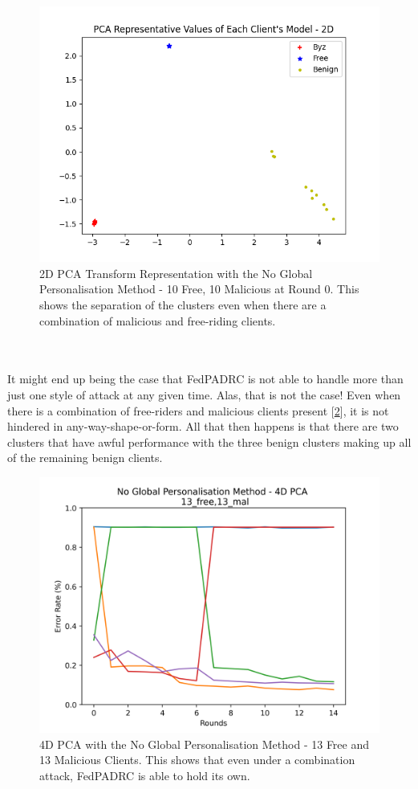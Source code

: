 \\ \\
\begin{figure}[htbp]
	\centering
    \includegraphics[scale=0.5]{my_agg/graphs/10mal_10free_r0_no_global.png}
    \caption{2D PCA Transform Representation with the No Global Personalisation Method - 10 Free, 10 Malicious at Round 0. This shows the separation of the clusters even when there are a combination of malicious and free-riding clients.}
	\label{fig:10mal10free_rep}
\end{figure}
\\ \\
It might end up being the case that FedPADRC is not able to handle more than just one style of attack at any given time.
Alas, that is not the case!
Even when there is a combination of free-riders and malicious clients present [\ref{fig:no_13free_13mal}], it is not hindered in any-way-shape-or-form.
All that then happens is that there are two clusters that have awful performance with the three benign clusters making up all of the remaining benign clients.
\begin{figure}[htbp]
	\centering
    \includegraphics[scale=0.5]{my_agg/graphs/no_global_13free_13mal.png}
    \caption{4D PCA with the No Global Personalisation Method - 13 Free and 13 Malicious Clients. This shows that even under a combination attack, FedPADRC is able to hold its own.}
	\label{fig:no_13free_13mal}
\end{figure}
